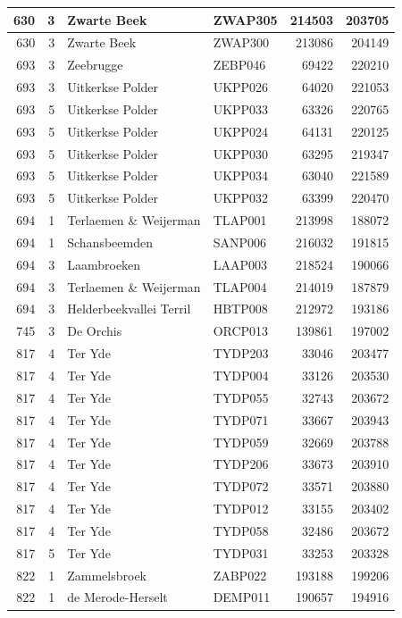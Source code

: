 \documentclass[11pt,]{book}
\begin{document}
\begin{table}
\begin{tabular}[t]{r|r|l|l|r|r}
\hline
630 & 3 & Zwarte Beek & ZWAP305 & 214503 & 203705\\
\hline
630 & 3 & Zwarte Beek & ZWAP300 & 213086 & 204149\\
\hline
693 & 3 & Zeebrugge & ZEBP046 & 69422 & 220210\\
\hline
693 & 3 & Uitkerkse Polder & UKPP026 & 64020 & 221053\\
\hline
693 & 5 & Uitkerkse Polder & UKPP033 & 63326 & 220765\\
\hline
693 & 5 & Uitkerkse Polder & UKPP024 & 64131 & 220125\\
\hline
693 & 5 & Uitkerkse Polder & UKPP030 & 63295 & 219347\\
\hline
693 & 5 & Uitkerkse Polder & UKPP034 & 63040 & 221589\\
\hline
693 & 5 & Uitkerkse Polder & UKPP032 & 63399 & 220470\\
\hline
694 & 1 & Terlaemen \& Weijerman & TLAP001 & 213998 & 188072\\
\hline
694 & 1 & Schansbeemden & SANP006 & 216032 & 191815\\
\hline
694 & 3 & Laambroeken & LAAP003 & 218524 & 190066\\
\hline
694 & 3 & Terlaemen \& Weijerman & TLAP004 & 214019 & 187879\\
\hline
694 & 3 & Helderbeekvallei Terril & HBTP008 & 212972 & 193186\\
\hline
745 & 3 & De Orchis & ORCP013 & 139861 & 197002\\
\hline
817 & 4 & Ter Yde & TYDP203 & 33046 & 203477\\
\hline
817 & 4 & Ter Yde & TYDP004 & 33126 & 203530\\
\hline
817 & 4 & Ter Yde & TYDP055 & 32743 & 203672\\
\hline
817 & 4 & Ter Yde & TYDP071 & 33667 & 203943\\
\hline
817 & 4 & Ter Yde & TYDP059 & 32669 & 203788\\
\hline
817 & 4 & Ter Yde & TYDP206 & 33673 & 203910\\
\hline
817 & 4 & Ter Yde & TYDP072 & 33571 & 203880\\
\hline
817 & 4 & Ter Yde & TYDP012 & 33155 & 203402\\
\hline
817 & 4 & Ter Yde & TYDP058 & 32486 & 203672\\
\hline
817 & 5 & Ter Yde & TYDP031 & 33253 & 203328\\
\hline
822 & 1 & Zammelsbroek & ZABP022 & 193188 & 199206\\
\hline
822 & 1 & de Merode-Herselt & DEMP011 & 190657 & 194916\\

\end{tabular}
\end{table}
\end{document}
